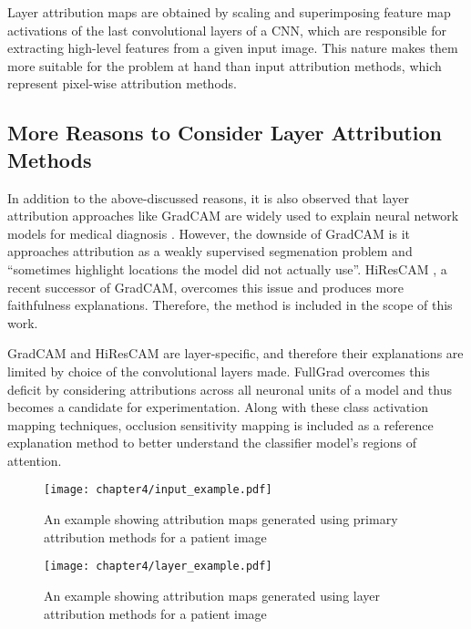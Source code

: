 \documentclass[../report.tex]{subfiles}
\begin{document}
\begin{itemize}
    	Layer attribution maps are obtained by scaling and superimposing feature map activations of the last convolutional layers of a CNN, which are responsible for extracting high-level features from a given input image. This nature makes them more suitable for the problem at hand than input attribution methods, which represent pixel-wise attribution methods.
    \end{itemize}
	
    \subsection{More Reasons to Consider Layer Attribution Methods}
    \noindent
    In addition to the above-discussed reasons, it is also observed that layer attribution approaches like GradCAM are widely used to explain neural network models for medical diagnosis \cite{lee2019explainable} \cite{nunnari2021overlap} \cite{hicks2021explaining}. However, the downside of GradCAM is it approaches
    attribution as a weakly supervised segmenation problem and \enquote{sometimes highlight locations the model did not actually use}\cite{draelos2020hirescam}. HiResCAM \cite{draelos2020hirescam}, a recent successor of GradCAM, overcomes this issue and produces more faithfulness explanations. Therefore, the method is included in the scope of this work.
    
    GradCAM and HiResCAM are layer-specific, and therefore their explanations are limited by choice of the convolutional layers made. FullGrad \cite{srinivas2019full} overcomes this deficit by considering attributions across all neuronal units of a model and thus becomes a candidate for experimentation. Along with these class activation mapping techniques, occlusion sensitivity mapping is included as a reference explanation method to better understand the classifier model's regions of attention.
    \begin{figure}[ht]
		\hspace*{-2cm}    
    	\texttt{[image: chapter4/input\_example.pdf]}
    	\caption[An example showing attribution maps generated using primary attribution methods for a patient image]{An example showing attribution maps generated using primary attribution methods for a patient image}
    	\label{example_ipa}
    	 \vspace{1cm}
    	\hspace*{-1.0cm}    
    	\texttt{[image: chapter4/layer\_example.pdf]}
    	\caption[An example showing attribution maps generated using layer attribution methods for a patient image]{An example showing attribution maps generated using layer attribution methods for a patient image}
    	\label{example_la}
    \end{figure}
\end{document}
